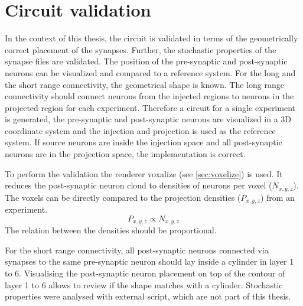 \section{Circuit validation}
In the context of this thesis, the circuit is validated in terms of the geometrically correct placement of
the synapses. Further, the stochastic properties of the synapse files are validated.
The position of the pre-synaptic and post-synaptic neurons can be visualized and  compared to a 
reference system. For the long and the short range connectivity, the geometrical shape is known.
The long range connectivity should connect neurons from the injected regions to neurons
in the projected region for each experiment. Therefore a circuit for a single experiment is 
generated, the pre-synaptic and post-synaptic neurons are visualized in a 3D coordinate system and the injection
and projection is used as the reference system. If source neurons are inside the injection space and all
post-synaptic neurons are in the projection space, the implementation is correct.

To perform the validation the renderer voxalize (see \ref{sec:voxelize}) is used.
It reduces the post-synaptic neuron cloud to densities of neurons per voxel ($N_{x,y,z}$).
The voxels can be directly compared to the projection densities ($P_{x,y,z}$) from an experiment.
\begin{equation}
	P_{x,y,z} \propto N_{x,y,z}
\end{equation}
The relation between the densities should be proportional.

For the short range connectivity, all post-synaptic neurons connected via synapses to the same pre-synaptic neuron should
lay inside a cylinder in layer 1 to 6. Visualising the post-synaptic neuron placement on top of the contour of layer 1 to
6 allows to review if the shape matches with a cylinder.
Stochastic properties were analysed with external script, which are not part of this thesis.

